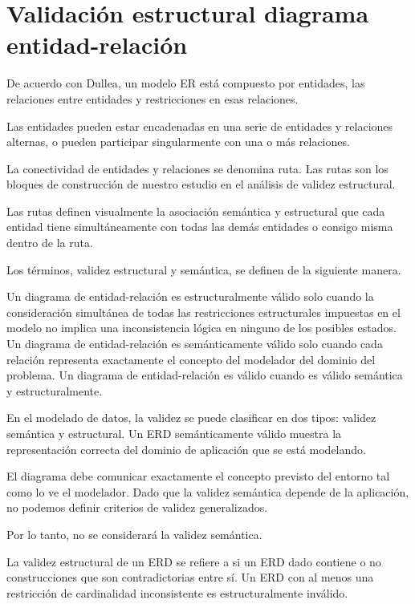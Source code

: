 \section{Validación estructural diagrama entidad-relación}

De acuerdo con Dullea\cite{dullea_analysis_2003}, un modelo ER está compuesto por entidades, las relaciones entre entidades y restricciones en esas relaciones. 


Las entidades pueden estar encadenadas en una serie de entidades y relaciones alternas, o pueden participar singularmente con una o más relaciones. 


La conectividad de entidades y relaciones se denomina ruta. Las rutas son los bloques de construcción de nuestro estudio en el análisis de validez estructural.


Las rutas definen visualmente la asociación semántica y estructural que cada entidad tiene simultáneamente con todas las demás entidades o consigo misma dentro de la ruta.

Los términos, validez estructural y semántica, se definen de la siguiente manera.

\theoremstyle{definition}
\begin{definition}{}
    Un diagrama de entidad-relación es estructuralmente válido solo cuando la consideración simultánea de todas las restricciones estructurales impuestas en el modelo no implica una inconsistencia lógica en ninguno de los posibles estados. Un diagrama de entidad-relación es semánticamente válido solo cuando cada relación representa exactamente el concepto del modelador del dominio del problema. Un diagrama de entidad-relación es válido cuando es válido semántica y estructuralmente.
\end{definition}


En el modelado de datos, la validez se puede clasificar en dos tipos: validez semántica y estructural. Un ERD semánticamente válido muestra la representación correcta del dominio de aplicación que se está modelando.


El diagrama debe comunicar exactamente el concepto previsto del entorno tal como lo ve el modelador. Dado que la validez semántica depende de la aplicación, no podemos definir criterios de validez generalizados.


Por lo tanto, no se considerará la validez semántica.


La validez estructural de un ERD se refiere a si un ERD dado contiene o no construcciones que son contradictorias entre sí. Un ERD con al menos una restricción de cardinalidad inconsistente es estructuralmente inválido.


